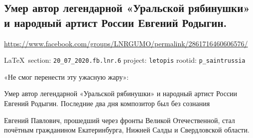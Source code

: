  
 

\subsection{Умер автор легендарной «Уральской рябинушки» и народный артист России Евгений Родыгин.}
\label{sec:20_07_2020.fb.lnr.6}
\url{https://www.facebook.com/groups/LNRGUMO/permalink/2861716460606576/}
  
\vspace{0.5cm}
{\small\LaTeX~section: \verb|20_07_2020.fb.lnr.6| project: \verb|letopis| rootid: \verb|p_saintrussia|}
\vspace{0.5cm}

«Не смог перенести эту ужасную жару»:

Умер автор легендарной «Уральской рябинушки» и народный артист России Евгений Родыгин.
Последние два дня композитор был без сознания

Евгений Павлович, прошедший через фронты Великой Отечественной, стал почётным гражданином Екатеринбурга, Нижней Салды и Свердловской области. 
